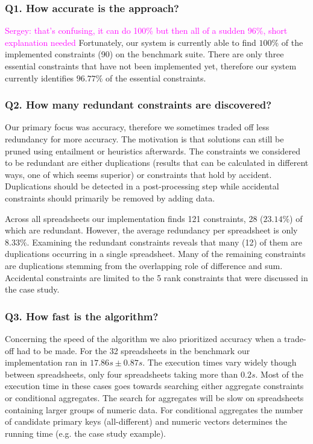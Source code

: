 \documentclass{ecai}
\newcommand{\sergey}[1]{\textcolor{magenta}{{\sc Sergey:} #1}\xspace}
\begin{document}
\subsubsection*{Q1. How accurate is the approach?}
\sergey{that's confusing, it can do 100\% but then all of a sudden 96\%, short explanation needed}
Fortunately, our system is currently able to find $100\%$ of the implemented constraints (90) on the benchmark suite.
There are only three essential constraints that have not been implemented yet, therefore our system currently identifies $96.77\%$ of the essential constraints.

\subsubsection*{Q2. How many redundant constraints are discovered?}
Our primary focus was accuracy, therefore we sometimes traded off less redundancy for more accuracy.
The motivation is that solutions can still be pruned using entailment or heuristics afterwards.
The constraints we considered to be redundant are either duplications (results that can be calculated in different ways, one of which seems superior) or constraints that hold by accident.
Duplications should be detected in a post-processing step while accidental constraints should primarily be removed by adding data.

Across all spreadsheets our implementation finds 121 constraints, 28 ($23.14\%$) of which are redundant.
However, the average redundancy per spreadsheet is only $8.33\%$.
Examining the redundant constraints reveals that many (12) of them are duplications occurring in a single spreadsheet.
Many of the remaining constraints are duplications stemming from the overlapping role of difference and sum.
Accidental constraints are limited to the 5 rank constraints that were discussed in the case study.

\subsubsection*{Q3. How fast is the algorithm?}
Concerning the speed of the algorithm we also prioritized accuracy when a trade-off had to be made.
For the 32 spreadsheets in the benchmark our implementation ran in $17.86s \pm 0.87s$.
The execution times vary widely though between spreadsheets, only four spreadsheets taking more than $0.2s$.
Most of the execution time in these cases goes towards searching either aggregate constraints or conditional aggregates.
The search for aggregates will be slow on spreadsheets containing larger groups of numeric data.
For conditional aggregates the number of candidate primary keys (all-different) and numeric vectors determines the running time (e.g. the case study example).
\end{document}
